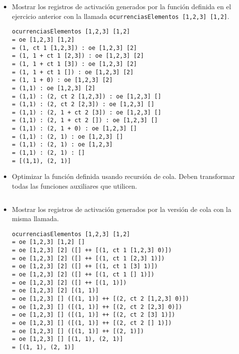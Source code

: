 \documentclass{article}
\begin{document}
\begin{enumerate}
\begin{itemize}
        \item Mostrar los registros de activación generados por la función definida en el ejercicio anterior con la llamada
          \texttt{ocurrenciasElementos [1,2,3] [1,2]}.
          \begin{verbatim}
ocurrenciasElementos [1,2,3] [1,2]
= oe [1,2,3] [1,2]
= (1, ct 1 [1,2,3]) : oe [1,2,3] [2]
= (1, 1 + ct 1 [2,3]) : oe [1,2,3] [2]
= (1, 1 + ct 1 [3]) : oe [1,2,3] [2]
= (1, 1 + ct 1 []) : oe [1,2,3] [2]
= (1, 1 + 0) : oe [1,2,3] [2]
= (1,1) : oe [1,2,3] [2]
= (1,1) : (2, ct 2 [1,2,3]) : oe [1,2,3] []
= (1,1) : (2, ct 2 [2,3]) : oe [1,2,3] []
= (1,1) : (2, 1 + ct 2 [3]) : oe [1,2,3] []
= (1,1) : (2, 1 + ct 2 []) : oe [1,2,3] []
= (1,1) : (2, 1 + 0) : oe [1,2,3] []
= (1,1) : (2, 1) : oe [1,2,3] []
= (1,1) : (2, 1) : oe [1,2,3]
= (1,1) : (2, 1) : []
= [(1,1), (2, 1)]
          \end{verbatim}

        \item Optimizar la función definida usando recursión de cola. Deben transformar todas las funciones auxiliares que utilicen.
          \inputminted[style=pastie,fontsize=\small]{haskell}{ej3_2.hs}

        \item Mostrar los registros de activación generados por la versión de cola con la misma llamada.
          \begin{verbatim}
ocurrenciasElementos [1,2,3] [1,2]
= oe [1,2,3] [1,2] []
= oe [1,2,3] [2] ([] ++ [(1, ct 1 [1,2,3] 0)])
= oe [1,2,3] [2] ([] ++ [(1, ct 1 [2,3] 1)])
= oe [1,2,3] [2] ([] ++ [(1, ct 1 [3] 1)])
= oe [1,2,3] [2] ([] ++ [(1, ct 1 [] 1)])
= oe [1,2,3] [2] ([] ++ [(1, 1)])
= oe [1,2,3] [2] [(1, 1)]
= oe [1,2,3] [] ([(1, 1)] ++ [(2, ct 2 [1,2,3] 0)])
= oe [1,2,3] [] ([(1, 1)] ++ [(2, ct 2 [2,3] 0)])
= oe [1,2,3] [] ([(1, 1)] ++ [(2, ct 2 [3] 1)])
= oe [1,2,3] [] ([(1, 1)] ++ [(2, ct 2 [] 1)])
= oe [1,2,3] [] ([(1, 1)] ++ [(2, 1)])
= oe [1,2,3] [] [(1, 1), (2, 1)]
= [(1, 1), (2, 1)]
          \end{verbatim}

      \end{itemize}
  \end{enumerate}
\end{document}
